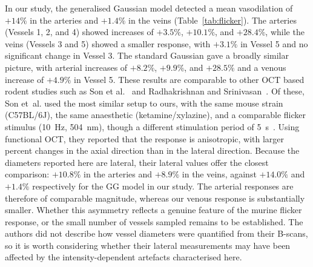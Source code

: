 In our study, the generalised Gaussian model detected a mean vasodilation of $+14\%$ in the arteries and $+1.4\%$ in the veins (Table~\ref{tab:flicker}). The arteries (Vessels 1, 2, and 4) showed increases of $+3.5\%$, $+10.1\%$, and $+28.4\%$, while the veins (Vessels 3 and 5) showed a smaller response, with $+3.1\%$ in Vessel 5 and no significant change in Vessel 3. The standard Gaussian gave a broadly similar picture, with arterial increases of $+8.2\%$, $+9.9\%$, and $+28.5\%$ and a venous increase of $+4.9\%$ in Vessel 5. These results are comparable to other OCT based rodent studies such as Son et al.~\cite{sonFunctionalOCTReveals2024} and Radhakrishnan and Srinivasan~\cite{radhakrishnanMultiparametricOpticalCoherence2013}. Of these, Son et~al. used the most similar setup to ours, with the same mouse strain (C57BL/6J), the same anaesthetic (ketamine/xylazine), and a comparable flicker stimulus (10~Hz, 504~nm), though a different stimulation period of 5~s~\cite{sonFunctionalOCTReveals2024}. Using functional OCT, they reported that the response is anisotropic, with larger percent changes in the axial direction than in the lateral direction. Because the diameters reported here are lateral, their lateral values offer the closest comparison: $+10.8\%$ in the arteries and $+8.9\%$ in the veins, against $+14.0\%$ and $+1.4\%$ respectively for the GG model in our study. The arterial responses are therefore of comparable magnitude, whereas our venous response is substantially smaller. Whether this asymmetry reflects a genuine feature of the murine flicker response, or the small number of vessels sampled remains to be established. The authors did not describe how vessel diameters were quantified from their B-scans, so it is worth considering whether their lateral measurements may have been affected by the intensity-dependent artefacts characterised here. %
